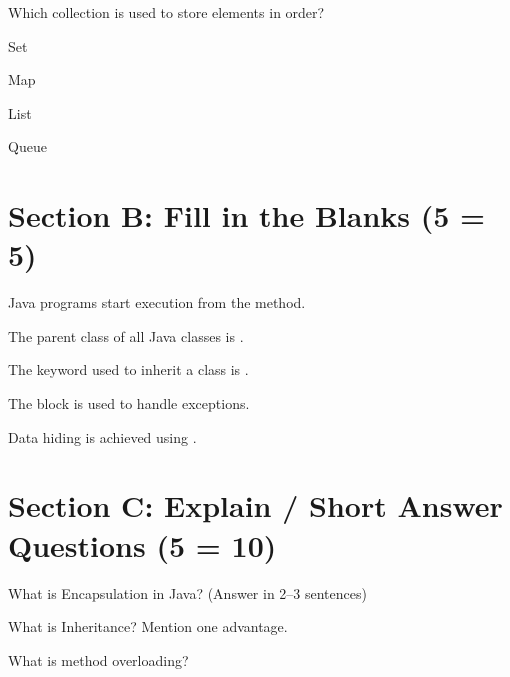 \documentclass{USTBExam}
\begin{document}
\begin{question}
Which collection is used to store elements in order?
\paren
\begin{choices}
\item Set
\item Map
\item List
\item Queue
\end{choices}
\end{question}


\section{Section B: Fill in the Blanks (5  = 5)}

\begin{question}
Java programs start execution from the \fillin method.
\end{question}

\begin{question}
The parent class of all Java classes is \fillin.
\end{question}

\begin{question}
The keyword used to inherit a class is \fillin.
\end{question}

\begin{question}
The \fillin block is used to handle exceptions.
\end{question}

\begin{question}
Data hiding is achieved using \fillin.
\end{question}


\section{Section C: Explain / Short Answer Questions (5  = 10)}

\begin{problem}
What is Encapsulation in Java? (Answer in 2--3 sentences)
\end{problem}

\begin{problem}
What is Inheritance? Mention one advantage.
\end{problem}

\begin{problem}
What is method overloading?
\end{problem}
\end{document}
